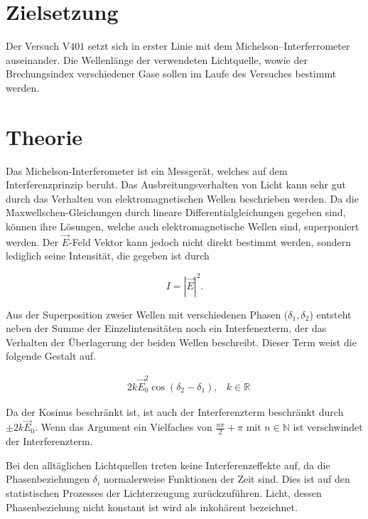 \section{Zielsetzung}

Der Versuch V$\num{401}$ setzt sich in erster Linie mit dem Michelson--Interferrometer
auseinander. Die Wellenlänge der verwendeten Lichtquelle, wowie der Brechungsindex
verschiedener Gase sollen im Laufe des Versuches bestimmt werden.

\section{Theorie}

Das Michelson-Interferometer ist ein Messgerät, welches auf dem Interferenzprinzip
beruht. Das Ausbreitungsverhalten von Licht kann sehr gut durch das
Verhalten von elektromagnetischen Wellen beschrieben werden.
Da die Maxwellschen-Gleichungen durch lineare Differentialgleichungen gegeben sind,
können ihre Lösungen, welche auch elektromagnetische Wellen sind, superponiert werden.
Der $\vec{E}$-Feld Vektor kann jedoch nicht direkt bestimmt werden, sondern
lediglich seine Intensität, die gegeben ist durch

\begin{equation}
  \label{eqn:Intensitaet}
  I = \left|\vec{E}\right|^2.
\end{equation}

Aus der Superposition zweier Wellen mit verschiedenen Phasen ($\delta_1, \delta_2$)
entsteht neben der Summe der Einzelintensitäten noch ein Interfenezterm,
der das Verhalten der Überlagerung der beiden Wellen beschreibt.
Dieser Term weist die folgende Gestalt auf.

\begin{align}
  \label{eqn:Interferenterm}
  &2k\vec{E}_0^2\cos{(\delta_2 - \delta_1)},& k\in \mathbb{R}
\end{align}

Da der Kosinus beschränkt ist, ist auch der Interferenzterm beschränkt
durch $\pm 2k\vec{E}_0$. Wenn das Argument ein Vielfaches von
$\frac{n\pi}{2} + \pi$ mit $n\in \mathbb{N}$ ist verschwindet der
Interferenzterm.

Bei den alltäglichen Lichtquellen treten keine Interferenzeffekte auf,
da die Phasenbeziehungen $\delta_i$ normalerweise Funktionen der Zeit sind.
Dies ist auf den statistischen Prozesses der Lichterzeugung zurückzuführen.
Licht, dessen Phasenbeziehung nicht konstant ist wird als inkohärent bezeichnet.

